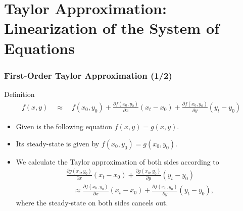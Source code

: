 \documentclass[10pt,c,aspectratio=1610,handout]{beamer}
\begin{document}
\section{Taylor Approximation:\\{\normalsize Linearization of the System of Equations}}%
\begin{frame}%
  \frametitle{First-Order Taylor Approximation (1/2)}%
  \begin{block}{Definition}%
    \begin{align*}%
      f\left(x,y\right) \quad \approx \quad f\left(x_0,y_0\right) + \frac{\partial f\left(x_0,y_0\right)}{\partial x} \left(x_t - x_0\right) + \frac{\partial f\left(x_0,y_0\right)}{\partial y}\left(y_t-y_0\right)%
    \end{align*}%
  \end{block}%
  \pause%
  \begin{itemize}%
    \item[$\blacktriangleright$] Given is the following equation $f \left(x,y\right) = g \left(x,y\right)$.%
    \item[$\blacktriangleright$] Its steady-state is given by $f \left(x_0,y_0\right) = g \left(x_0,y_0\right)$.%
    \pause%
    \item[$\blacktriangleright$] We calculate the Taylor approximation of both sides according to%
    \begin{align*}%
      &\frac{\partial g\left(x_0,y_0\right)}{\partial x} \left(x_t - x_0\right) + \frac{\partial g\left(x_0,y_0\right)}{\partial y}\left(y_t-y_0\right)\\%
      & \quad \approx \frac{\partial f\left(x_0,y_0\right)}{\partial x} \left(x_t - x_0\right) + \frac{\partial f\left(x_0,y_0\right)}{\partial y}\left(y_t-y_0\right),%
    \end{align*}%
    where the steady-state on both sides cancels out.%
  \end{itemize}%
\end{frame}%
\end{document}

